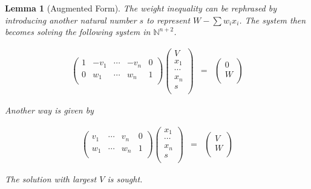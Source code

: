 \documentclass[11pt]{article}
\theoremstyle{change}
\newtheorem{lemma}[equation]{Lemma}
\theoremstyle{nonumberplain}
\numberwithin{equation}{section}
\begin{document}
\begin{lemma}[Augmented Form]

The weight inequality can be rephrased by introducing another natural number $s$ to represent $W - \sum w_i x_i$. The system then becomes solving the following system in $\mathbb{N}^{n+2}$.

\begin{eqnarray*}
\begin{pmatrix}
1 & - v_1 & \cdots & -v_n & 0\\
0 & w_1 & \cdots & w_n & 1\\
\end{pmatrix}
\begin{pmatrix}
V\\
x_1\\
\cdots\\
x_n\\
s\\
\end{pmatrix}
&=&
\begin{pmatrix}
0\\
W\\
\end{pmatrix}
\end{eqnarray*}

Another way is given by

\begin{eqnarray*}
\begin{pmatrix}
v_1 & \cdots & v_n & 0\\
w_1 & \cdots & w_n & 1\\
\end{pmatrix}
\begin{pmatrix}
x_1\\
\cdots\\
x_n\\
s\\
\end{pmatrix}
&=&
\begin{pmatrix}
V\\
W\\
\end{pmatrix}
\end{eqnarray*}

The solution with largest $V$ is sought.

\end{lemma}
\end{document}
